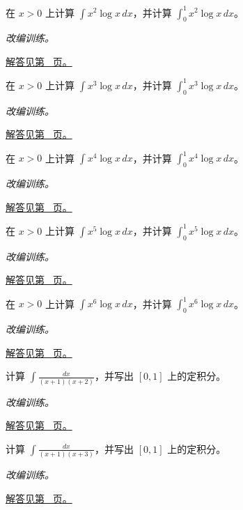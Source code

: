 \documentclass[12pt,fontset=fandol]{ctexart}
\begin{document}
\begin{example}[幂函数乘对数]\label{ex:c13q8}
在 $x>0$ 上计算 $\displaystyle\int x^{2}\log x\,dx$，并计算 $\displaystyle\int_0^1x^{2}\log x\,dx$。
\par\textit{改编训练。}\par\hyperref[ans:c13q8]{解答见第~\pageref{ans:c13q8} 页。}
\end{example}
\begin{example}[幂函数乘对数]\label{ex:c13q9}
在 $x>0$ 上计算 $\displaystyle\int x^{3}\log x\,dx$，并计算 $\displaystyle\int_0^1x^{3}\log x\,dx$。
\par\textit{改编训练。}\par\hyperref[ans:c13q9]{解答见第~\pageref{ans:c13q9} 页。}
\end{example}
\begin{example}[幂函数乘对数]\label{ex:c13q10}
在 $x>0$ 上计算 $\displaystyle\int x^{4}\log x\,dx$，并计算 $\displaystyle\int_0^1x^{4}\log x\,dx$。
\par\textit{改编训练。}\par\hyperref[ans:c13q10]{解答见第~\pageref{ans:c13q10} 页。}
\end{example}
\begin{example}[幂函数乘对数]\label{ex:c13q11}
在 $x>0$ 上计算 $\displaystyle\int x^{5}\log x\,dx$，并计算 $\displaystyle\int_0^1x^{5}\log x\,dx$。
\par\textit{改编训练。}\par\hyperref[ans:c13q11]{解答见第~\pageref{ans:c13q11} 页。}
\end{example}
\begin{example}[幂函数乘对数]\label{ex:c13q12}
在 $x>0$ 上计算 $\displaystyle\int x^{6}\log x\,dx$，并计算 $\displaystyle\int_0^1x^{6}\log x\,dx$。
\par\textit{改编训练。}\par\hyperref[ans:c13q12]{解答见第~\pageref{ans:c13q12} 页。}
\end{example}
\begin{example}[互异一次因子的部分分式]\label{ex:c13q13}
计算 $\displaystyle\int\frac{dx}{(x+1)(x+2)}$，并写出 $[0,1]$ 上的定积分。
\par\textit{改编训练。}\par\hyperref[ans:c13q13]{解答见第~\pageref{ans:c13q13} 页。}
\end{example}
\begin{example}[互异一次因子的部分分式]\label{ex:c13q14}
计算 $\displaystyle\int\frac{dx}{(x+1)(x+3)}$，并写出 $[0,1]$ 上的定积分。
\par\textit{改编训练。}\par\hyperref[ans:c13q14]{解答见第~\pageref{ans:c13q14} 页。}
\end{example}
\end{document}
